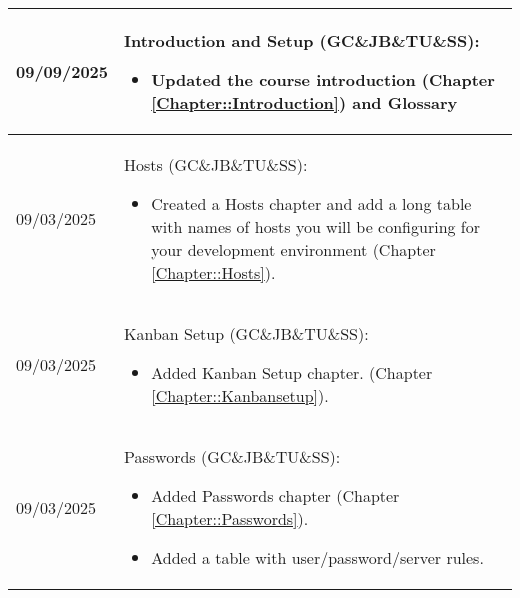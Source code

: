 \begin{longtable}{|l||p{13.5cm}|}
09/09/2025 & Introduction and Setup (GC\&JB\&TU\&SS):
\begin{itemize}[topsep=0pt,itemsep=0pt,parsep=0pt,partopsep=0pt,leftmargin=12pt]
\item Updated the course introduction (Chapter \ref{Chapter::Introduction}) and Glossary
\end{itemize} 
\\ \hline

09/03/2025 & Hosts (GC\&JB\&TU\&SS):
\begin{itemize}[topsep=0pt,itemsep=0pt,parsep=0pt,partopsep=0pt,leftmargin=12pt]
\item Created a Hosts chapter and add a long table with names of hosts you will be configuring for your development environment (Chapter \ref{Chapter::Hosts}).
\end{itemize} 
\\ \hline

09/03/2025 & Kanban Setup (GC\&JB\&TU\&SS):
\begin{itemize}[topsep=0pt,itemsep=0pt,parsep=0pt,partopsep=0pt,leftmargin=12pt]
\item Added Kanban Setup chapter.
(Chapter \ref{Chapter::Kanbansetup}).
\end{itemize} 
\\ \hline

09/03/2025 & Passwords (GC\&JB\&TU\&SS):
\begin{itemize}[topsep=0pt,itemsep=0pt,parsep=0pt,partopsep=0pt,leftmargin=12pt]
\item Added Passwords chapter
(Chapter \ref{Chapter::Passwords}).
\item Added a table with user/password/server rules. 
\end{itemize} 
\\ \hline

\end{longtable}
